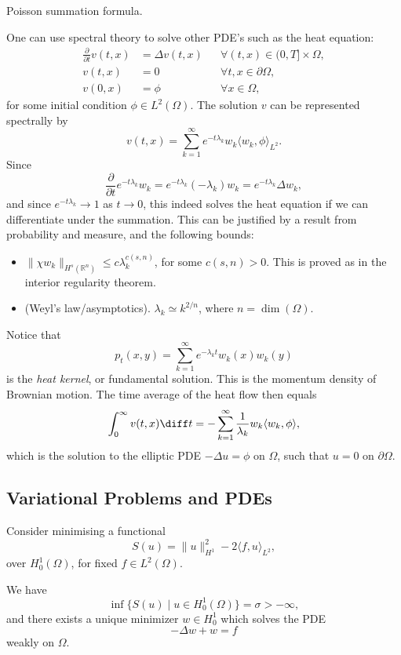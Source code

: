 \documentclass[12pt]{article}
\begin{document}
Poisson summation formula.

One can use spectral theory to solve other PDE's such as the heat equation:
\begin{align*}
	\frac{\partial}{\partial t}v(t, x) &= \Delta v(t, x) & &\forall (t, x) \in (0, T] \times \Omega, \\
	v(t, x) &= 0 & &\forall t, x \in \partial \Omega, \\
	v(0, x) &= \phi & &\forall x \in \Omega,
\end{align*}
for some initial condition $\phi \in L^2(\Omega)$. The solution $v$ can be represented spectrally by 
\[
	v(t, x) = \sum_{k = 1}^\infty e^{-t \lambda_k} w_k \langle w_k, \phi \rangle_{L^2}.
\]
Since
\[
\frac{\partial}{\partial t} e^{-t \lambda_k} w_k = e^{-t \lambda_k} (-\lambda_k) w_k = e^{-t \lambda_k} \Delta w_k,
\]
and since $e^{-t \lambda_k} \to 1$ as $t \to 0$, this indeed solves the heat equation if we can differentiate under the summation. This can be justified by a result from probability and measure, and the following bounds:
\begin{itemize}
	\item $\|\chi w_k\|_{H^s(\mathbb{R}^n)} \leq c \lambda_k^{c(s, n)}$, for some $c(s, n) > 0$. This is proved as in the interior regularity theorem.
	\item (Weyl's law/asymptotics). $\lambda_k \simeq k^{2/n}$, where $n = \dim(\Omega)$.
\end{itemize}
Notice that
\[
p_t(x, y) = \sum_{k = 1}^\infty e^{-\lambda_k t}w_k(x) w_k(y)
\]
is the \emph{heat kernel}, or fundamental solution. This is the momentum density of Brownian motion. The time average of the heat flow then equals
\[
\int_0^\infty v(t, x) \diff t = - \sum_{k = 1}^\infty \frac{1}{\lambda_k} w_k \langle w_k, \phi\rangle,
\]
which is the solution to the elliptic PDE $-\Delta u = \phi$ on $\Omega$, such that $u = 0$ on $\partial \Omega$.

\subsection{Variational Problems and PDEs}
\label{sub:vp}

Consider minimising a functional
\[
S(u) = \|u\|^2_{H^1} - 2 \langle f, u \rangle_{L^2},
\]
over $H^1_0(\Omega)$, for fixed $f \in L^2(\Omega)$.

\begin{theorem}
	We have
	\[
		\inf \{S(u) \mid u \in H^1_0(\Omega)\} = \sigma > - \infty,
	\]
	and there exists a unique minimizer $w \in H^1_0$ which solves the PDE
	\[
	- \Delta w + w = f
	\]
	weakly on $\Omega$.
\end{theorem}
\end{document}
